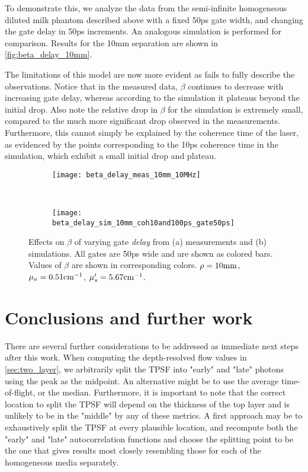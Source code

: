 To demonstrate this, we analyze the data from the semi-infinite homogeneous diluted milk phantom described above with a fixed 50ps gate width, and changing the gate delay in 50ps increments. An analogous simulation is performed for comparison. Results for the 10mm separation are shown in \autoref{fig:beta_delay_10mm}.

The limitations of this model are now more evident as fails to fully describe the observations. Notice that in the measured data, $\beta$ continues to decrease with increasing gate delay, whereas according to the simulation it plateaus beyond the initial drop. Also note the relative drop in $\beta$ for the simulation is extremely small, compared to the much more significant drop observed in the measurements. Furthermore, this cannot simply be explained by the coherence time of the laser, as evidenced by the points corresponding to the 10ps coherence time in the simulation, which exhibit a small initial drop and plateau.  


\begin{sidewaysfigure}
    \begin{subfigure}{0.49\textwidth}
        \centering
        \texttt{[image: beta\_delay\_meas\_10mm\_10MHz]}
        \caption{}
        \label{fig:beta_delay_meas_10mm}
    \end{subfigure}~%
    \begin{subfigure}{0.49\textwidth}
        \centering
        \texttt{[image: beta\_delay\_sim\_10mm\_coh10and100ps\_gate50ps]}
        \caption{}
        \label{fig:beta_delay_sim_10mm}
    \end{subfigure}
    \caption{Effects on $\beta$ of varying gate \emph{delay} from (a) measurements and (b) simulations. All gates are 50ps wide and are shown as colored bars. Values of $\beta$ are shown in corresponding colors. $\rho=10\textnormal{mm}$, $\mu_a=0.51\textnormal{cm}^{-1}$, $\mu_s'=5.67\textnormal{cm}^{-1}$.}
    \label{fig:beta_delay_10mm}
\end{sidewaysfigure}





\section{Conclusions and further work}
There are several further considerations to be addressed as immediate next steps after this work. When computing the depth-resolved flow values in \autoref{sec:two_layer}, we arbitrarily split the TPSF into "early" and "late" photons using the peak as the midpoint. An alternative might be to use the average time-of-flight, or the median. Furthermore, it is important to note that the correct location to split the TPSF will depend on the thickness of the top layer and is unlikely to be in the "middle" by any of these metrics. A first approach may be to exhaustively split the TPSF at every plausible location, and recompute both the "early" and "late" autocorrelation functions and choose the splitting point to be the one that gives results most closely resembling those for each of the homogeneous media separately.

